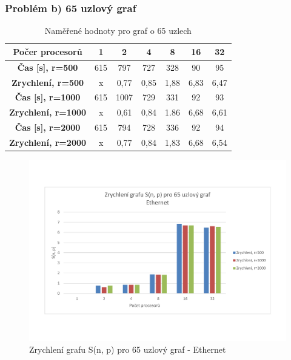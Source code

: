\documentclass[11pt]{article}
\begin{document}
\subsubsection{Problém b) 65 uzlový graf}
\begin{table}[h]
	\caption{Naměřené hodnoty pro graf o 65 uzlech}
	\label{tab:namereneHodnotyGraf65}
	\centering
	\begin{tabular}{| c || c | c | c | c | c | c |}
		\hline
		\textbf{Počer procesorů} & \textbf{1} & \textbf{2} & \textbf{4} & \textbf{8} & \textbf{16} & \textbf{32} \\
		\hline \hline
		\textbf{Čas [s], r=500} & 615 & 797 & 727 & 328 & 90 & 95 \\
		\hline
		\textbf{Zrychlení, r=500} & x & 0,77 & 0,85 & 1,88 & 6,83 & 6,47 \\
		\hline
		\textbf{Čas [s], r=1000} & 615 & 1007 & 729 & 331 & 92 & 93 \\
		\hline
		\textbf{Zrychlení, r=1000} & x & 0,61 & 0,84 & 1.86 & 6,68 & 6,61 \\
		\hline
		\textbf{Čas [s], r=2000} & 615 & 794 & 728 & 336 & 92 & 94 \\
		\hline
		\textbf{Zrychlení, r=2000} & x & 0,77 & 0,84 & 1,83 & 6,68 & 6,54 \\
		\hline
	\end{tabular}
\end{table}

\begin{figure}[h]
  \centering
 	\caption{Zrychlení grafu S(n, p) pro 65 uzlový graf - Ethernet}
  	\includegraphics[width=15cm]{zrychleni65.pdf}
\end{figure}
\end{document}
